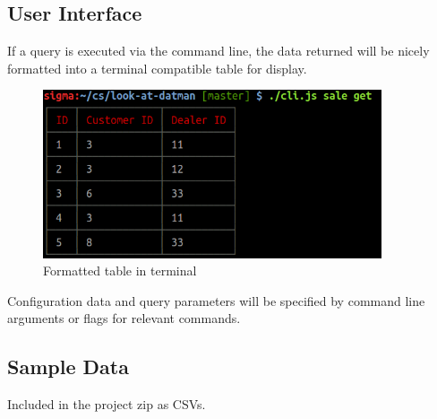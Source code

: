 \documentclass{math}
\begin{document}
\subsection*{User Interface}
If a query is executed via the command line, the data returned will be nicely
formatted into a terminal compatible table for display.
\begin{figure}[H]
  \centering
  \includegraphics[width=10cm]{assets/phase2_example_table.png}
  \caption{Formatted table in terminal}
\end{figure}
Configuration data and query parameters will be specified by command line
arguments or flags for relevant commands.

\subsection*{Sample Data}
Included in the project zip as CSVs.
\end{document}
